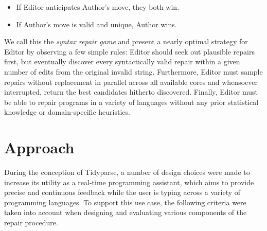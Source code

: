 \documentclass[sigplan,screen]{acmart}
\begin{document}
\begin{itemize}
  \item If Editor anticipates Author's move, they both win.
  \item If Author's move is valid and unique, Author wins.
\end{itemize}

We call this the \textit{syntax repair game} and present a nearly optimal strategy for Editor by observing a few simple rules: Editor should seek out plausible repairs first, but eventually discover every syntactically valid repair within a given number of edits from the original invalid string. Furthermore, Editor must sample repairs without replacement in parallel across all available cores and whensoever interrupted, return the best candidates hitherto discovered. Finally, Editor must be able to repair programs in a variety of languages without any prior statistical knowledge or domain-specific heuristics. %

\section{Approach}


During the conception of Tidyparse, a number of design choices were made to increase its utility as a real-time programming assistant, which aims to provide precise and continuous feedback while the user is typing across a variety of programming languages. To support this use case, the following criteria were taken into account when designing and evaluating various components of the repair procedure.
\end{document}
